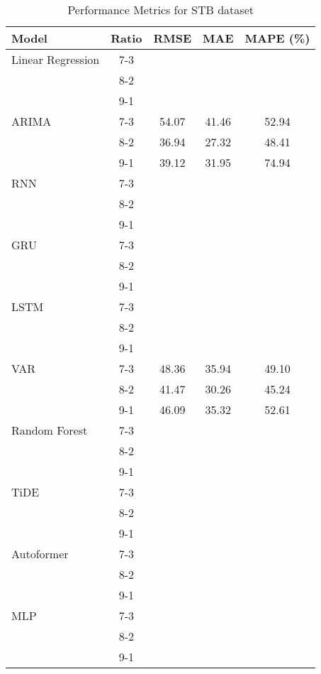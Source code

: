 \begin{table}[h!]
    \centering
    \caption{Performance Metrics for STB dataset}
    \begin{tabular}{|l|c|c|c|c|}
    \hline
    \rowcolor{orange!30} \textbf{Model} & \textbf{Ratio} & \textbf{RMSE} & \textbf{MAE} & \textbf{MAPE (\%)} \\ \hline
    \rowcolor{white} Linear Regression & 7-3 &  &  &  \\ \hline
    \rowcolor{white}  & 8-2 &  &  &  \\ \hline
    \rowcolor{white}  & 9-1 &  &  &  \\ \hline
    \rowcolor{white} ARIMA & 7-3 & 54.07 & 41.46 & 52.94 \\ \hline
    \rowcolor{white}  & 8-2 & 36.94 & 27.32 & 48.41 \\ \hline
    \rowcolor{white}  & 9-1 & 39.12 & 31.95 & 74.94 \\ \hline
    \rowcolor{white} RNN & 7-3 &  &  &  \\ \hline
    \rowcolor{white}  & 8-2 &  &  &  \\ \hline
    \rowcolor{white}  & 9-1 &  &  &  \\ \hline
    \rowcolor{green!30} GRU & 7-3 &  &  &  \\ \hline
    \rowcolor{green!30}  & 8-2 &  &  &  \\ \hline
    \rowcolor{green!30}  & 9-1 &  &  &  \\ \hline
    \rowcolor{white} LSTM & 7-3 &  &  &  \\ \hline
    \rowcolor{white}  & 8-2 &  &  &  \\ \hline
    \rowcolor{white}  & 9-1 &  &  &  \\ \hline
    \rowcolor{white} VAR & 7-3 & 48.36 & 35.94 & 49.10 \\ \hline
    \rowcolor{white}  & 8-2 & 41.47 & 30.26 & 45.24 \\ \hline
    \rowcolor{white}  & 9-1 & 46.09 & 35.32 & 52.61 \\ \hline
    \rowcolor{white} Random Forest & 7-3 &  &  &  \\ \hline
    \rowcolor{white}  & 8-2 &  &  &  \\ \hline
    \rowcolor{white}  & 9-1 &  &  &  \\ \hline
    \rowcolor{green!30} TiDE & 7-3 &  &  &  \\ \hline
    \rowcolor{green!30}  & 8-2 &  &  &  \\ \hline
    \rowcolor{green!30}  & 9-1 &  &  &  \\ \hline
    \rowcolor{white} Autoformer & 7-3 &  &  &  \\ \hline
    \rowcolor{white}  & 8-2 &  &  &  \\ \hline
    \rowcolor{white}  & 9-1 &  &  &  \\ \hline
    \rowcolor{green!30} MLP & 7-3 &  &  &  \\ \hline
    \rowcolor{green!30}  & 8-2 &  &  &  \\ \hline
    \rowcolor{green!30}  & 9-1 &  &  &  \\ \hline
    \end{tabular}
    \end{table}